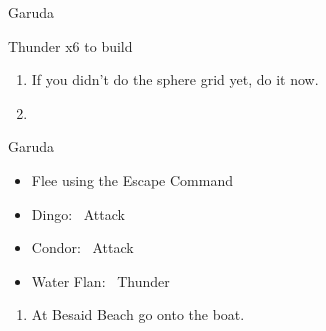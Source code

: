 \begin{battle}{Garuda}
	\begin{itemize}
		\summon{\valefor}
		\valeforf Thunder x6 to build \od
	\end{itemize}
\end{battle}
\begin{enumerate}[resume]
	\item If you didn't do the sphere grid yet, do it now.
	\item \formation{\tidus}{\yuna}{\lulu}
\end{enumerate}
\begin{battle}{Garuda}
	\begin{itemize}
		\item Flee using the Escape Command
	\end{itemize}
\end{battle}
\begin{encounters}
	\begin{itemize}
		\item Dingo: \tidus\ Attack
		\item Condor: \wakka\ Attack
		\item Water Flan: \lulu\ Thunder
	\end{itemize}
\end{encounters}
\begin{enumerate}[resume]
	\item At Besaid Beach go onto the boat.
\end{enumerate}